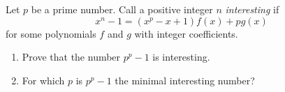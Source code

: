 \documentclass{article}
\begin{document}
\setlength{\parindent}{0pt}
Let $p$ be a prime number. Call a positive integer $n$ \emph{interesting} if$$x^{n}-1=(x^{p}-x+1)f(x)+pg(x)$$for some polynomials $f$ and $g$ with integer coefficients.
\begin{enumerate}[label=\alph*)]
\item Prove that the number $p^{p}-1$ is interesting.
\item For which $p$ is $p^{p}-1$ the minimal interesting number?
\end{enumerate}
\end{document}
